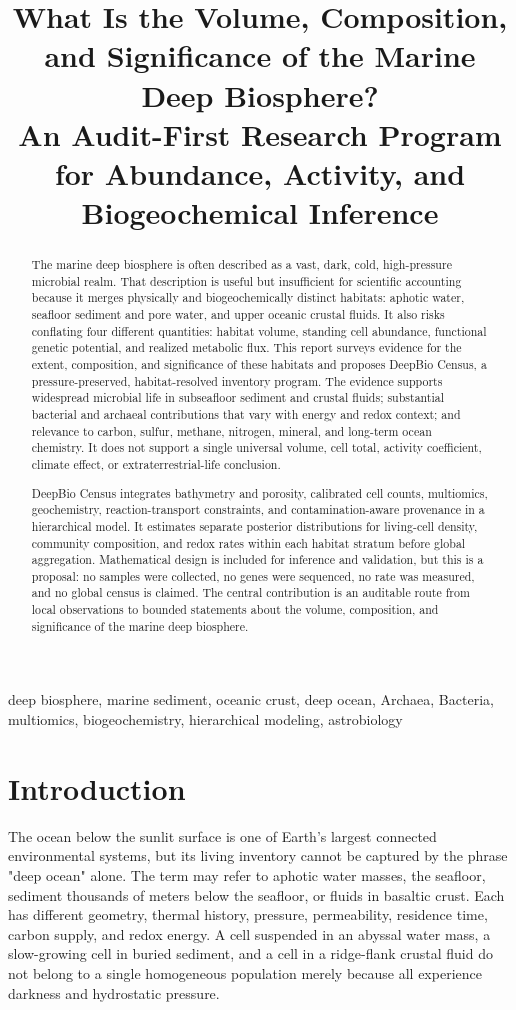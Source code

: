 \documentclass[conference]{../../../../Conference-LaTeX-template_10-17-19/IEEEtran}
\title{What Is the Volume, Composition, and Significance of the Marine Deep Biosphere?\\
An Audit-First Research Program for Abundance, Activity, and Biogeochemical Inference}
\author{\IEEEauthorblockN{Research Proposal}
\IEEEauthorblockA{Evidence-bounded four-agent synthesis -- Environmental and astrobiology design only}}
\begin{document}
\maketitle

\begin{abstract}
The marine deep biosphere is often described as a vast, dark, cold, high-pressure microbial realm. That description is useful but insufficient for scientific accounting because it merges physically and biogeochemically distinct habitats: aphotic water, seafloor sediment and pore water, and upper oceanic crustal fluids. It also risks conflating four different quantities: habitat volume, standing cell abundance, functional genetic potential, and realized metabolic flux. This report surveys evidence for the extent, composition, and significance of these habitats and proposes DeepBio Census, a pressure-preserved, habitat-resolved inventory program. The evidence supports widespread microbial life in subseafloor sediment and crustal fluids; substantial bacterial and archaeal contributions that vary with energy and redox context; and relevance to carbon, sulfur, methane, nitrogen, mineral, and long-term ocean chemistry. It does not support a single universal volume, cell total, activity coefficient, climate effect, or extraterrestrial-life conclusion.

DeepBio Census integrates bathymetry and porosity, calibrated cell counts, multiomics, geochemistry, reaction-transport constraints, and contamination-aware provenance in a hierarchical model. It estimates separate posterior distributions for living-cell density, community composition, and redox rates within each habitat stratum before global aggregation. Mathematical design is included for inference and validation, but this is a proposal: no samples were collected, no genes were sequenced, no rate was measured, and no global census is claimed. The central contribution is an auditable route from local observations to bounded statements about the volume, composition, and significance of the marine deep biosphere.
\end{abstract}

\begin{IEEEkeywords}
deep biosphere, marine sediment, oceanic crust, deep ocean, Archaea, Bacteria, multiomics, biogeochemistry, hierarchical modeling, astrobiology
\end{IEEEkeywords}

\section{Introduction}
The ocean below the sunlit surface is one of Earth's largest connected environmental systems, but its living inventory cannot be captured by the phrase "deep ocean" alone. The term may refer to aphotic water masses, the seafloor, sediment thousands of meters below the seafloor, or fluids in basaltic crust. Each has different geometry, thermal history, pressure, permeability, residence time, carbon supply, and redox energy. A cell suspended in an abyssal water mass, a slow-growing cell in buried sediment, and a cell in a ridge-flank crustal fluid do not belong to a single homogeneous population merely because all experience darkness and hydrostatic pressure.
\end{document}
